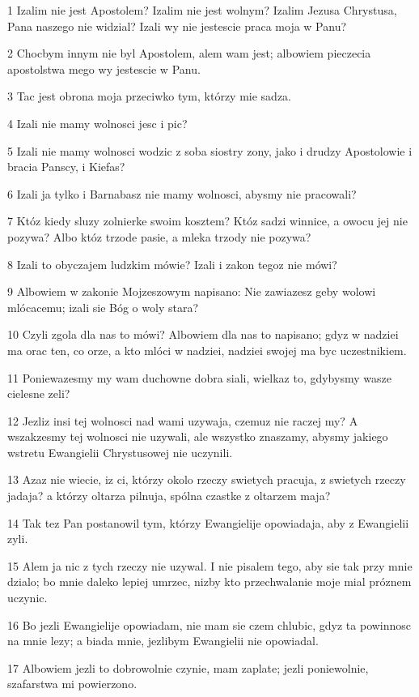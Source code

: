 \par 1 Izalim nie jest Apostolem? Izalim nie jest wolnym? Izalim Jezusa Chrystusa, Pana naszego nie widzial? Izali wy nie jestescie praca moja w Panu?
\par 2 Chocbym innym nie byl Apostolem, alem wam jest; albowiem pieczecia apostolstwa mego wy jestescie w Panu.
\par 3 Tac jest obrona moja przeciwko tym, którzy mie sadza.
\par 4 Izali nie mamy wolnosci jesc i pic?
\par 5 Izali nie mamy wolnosci wodzic z soba siostry zony, jako i drudzy Apostolowie i bracia Panscy, i Kiefas?
\par 6 Izali ja tylko i Barnabasz nie mamy wolnosci, abysmy nie pracowali?
\par 7 Któz kiedy sluzy zolnierke swoim kosztem? Któz sadzi winnice, a owocu jej nie pozywa? Albo któz trzode pasie, a mleka trzody nie pozywa?
\par 8 Izali to obyczajem ludzkim mówie? Izali i zakon tegoz nie mówi?
\par 9 Albowiem w zakonie Mojzeszowym napisano: Nie zawiazesz geby wolowi mlócacemu; izali sie Bóg o woly stara?
\par 10 Czyli zgola dla nas to mówi? Albowiem dla nas to napisano; gdyz w nadziei ma orac ten, co orze, a kto mlóci w nadziei, nadziei swojej ma byc uczestnikiem.
\par 11 Poniewazesmy my wam duchowne dobra siali, wielkaz to, gdybysmy wasze cielesne zeli?
\par 12 Jezliz insi tej wolnosci nad wami uzywaja, czemuz nie raczej my? A wszakzesmy tej wolnosci nie uzywali, ale wszystko znaszamy, abysmy jakiego wstretu Ewangielii Chrystusowej nie uczynili.
\par 13 Azaz nie wiecie, iz ci, którzy okolo rzeczy swietych pracuja, z swietych rzeczy jadaja? a którzy oltarza pilnuja, spólna czastke z oltarzem maja?
\par 14 Tak tez Pan postanowil tym, którzy Ewangielije opowiadaja, aby z Ewangielii zyli.
\par 15 Alem ja nic z tych rzeczy nie uzywal. I nie pisalem tego, aby sie tak przy mnie dzialo; bo mnie daleko lepiej umrzec, nizby kto przechwalanie moje mial próznem uczynic.
\par 16 Bo jezli Ewangielije opowiadam, nie mam sie czem chlubic, gdyz ta powinnosc na mnie lezy; a biada mnie, jezlibym Ewangielii nie opowiadal.
\par 17 Albowiem jezli to dobrowolnie czynie, mam zaplate; jezli poniewolnie, szafarstwa mi powierzono.
